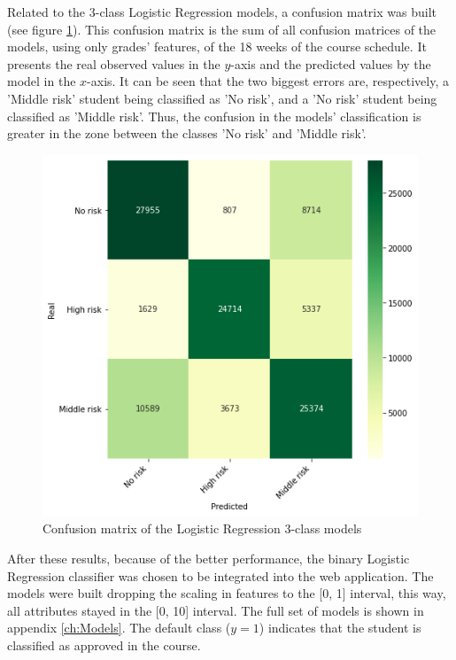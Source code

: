 Related to the 3-class Logistic Regression models, a confusion matrix was built (see figure \ref{fig:3ccm}). This confusion matrix is the sum of all confusion matrices of the models, using only grades' features, of the 18 weeks of the course schedule. It presents the real observed values in the $y$-axis and the predicted values by the model in the $x$-axis. It can be seen that the two biggest errors are, respectively, a 'Middle risk' student being classified as 'No risk', and a 'No risk' student being classified as 'Middle risk'. Thus, the confusion in the models' classification is greater in the zone between the classes 'No risk' and 'Middle risk'.

\begin{figure}[htb]
	\centering
  	\includegraphics[scale=.7]{Resultados/3classes_confusion_matrix.png}
  	\caption{Confusion matrix of the Logistic Regression 3-class models}
  	\label{fig:3ccm}
\end{figure}

After these results, because of the better performance, the binary Logistic Regression classifier was chosen to be integrated into the web application. The models were built dropping the scaling in features to the [0, 1] interval, this way, all attributes stayed in the [0, 10] interval. The full set of models is shown in appendix \ref{ch:Models}. The default class ($y=1$) indicates that the student is classified as approved in the course.

